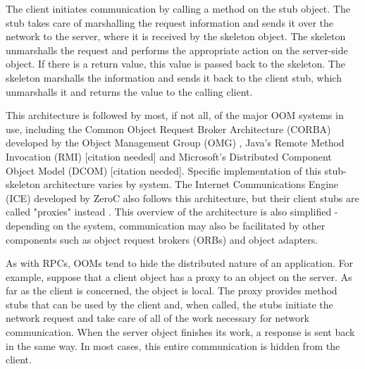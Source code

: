\documentclass{acm_proc_article-sp}
\begin{document}

The client initiates communication by calling a method on the stub object.  The stub takes care of marshalling the request information and sends it over the network to the server, where it is received by the skeleton object.  The skeleton unmarshalls the request and performs the appropriate action on the server-side object.  If there is a return value, this value is passed back to the skeleton.  The skeleton marshalls the information and sends it back to the client stub, which unmarshalls it and returns the value to the calling client.

This architecture is followed by most, if not all, of the major OOM systems in use, including the Common Object Request Broker Architecture (CORBA) developed by the Object Management Group (OMG) \cite{Emmerich:2007p8368}, Java's Remote Method Invocation (RMI) [citation needed] and Microsoft's Distributed Component Object Model (DCOM) [citation needed].  Specific implementation of this stub-skeleton architecture varies by system.  The Internet Communications Engine (ICE) developed by ZeroC also follows this architecture, but their client stubs are called "proxies" instead \cite{icemanual}.  This overview of the architecture is also simplified - depending on the system, communication may also be facilitated by other components such as object request brokers (ORBs) and object adapters.

As with RPCs, OOMs tend to hide the distributed nature of an application.  For example, suppose that a client object has a proxy to an object on the server.  As far as the client is concerned, the object is local.  The proxy provides method stubs that can be used by the client and, when called, the stubs initiate the network request and take care of all of the work necessary for network communication.  When the server object finishes its work, a response is sent back in the same way.  In most cases, this entire communication is hidden from the client.
\end{document}
